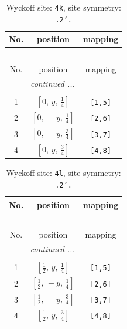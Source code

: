 \documentclass[fleqn,8pt]{jsarticle}
\begin{document}
\renewcommand{\arraystretch}{1.2}
\begin{longtable}{ccc}
\caption{Wyckoff site: {\tt 4k}, site symmetry: {\tt .2'.}}
 \\
 \hline \hline
No. & position & mapping \\ \hline \endfirsthead

\multicolumn{2}{l}{\tablename\ \thetable{}} \\
 \hline \hline
No. & position & mapping \\ \hline \endhead

 \hline \hline
\multicolumn{2}{r}{\footnotesize\it continued ...} \\ \endfoot

 \hline \hline
\multicolumn{2}{r}{} \\ \endlastfoot

1 & $\left[ 0,\, y,\, \frac{1}{4} \right]$ & {\tt [1,5]} \\ \hline
2 & $\left[ 0,\, - y,\, \frac{1}{4} \right]$ & {\tt [2,6]} \\ \hline
3 & $\left[ 0,\, - y,\, \frac{3}{4} \right]$ & {\tt [3,7]} \\ \hline
4 & $\left[ 0,\, y,\, \frac{3}{4} \right]$ & {\tt [4,8]} \\
\end{longtable}
\renewcommand{\arraystretch}{1.2}
\begin{longtable}{ccc}
\caption{Wyckoff site: {\tt 4l}, site symmetry: {\tt .2'.}}
 \\
 \hline \hline
No. & position & mapping \\ \hline \endfirsthead

\multicolumn{2}{l}{\tablename\ \thetable{}} \\
 \hline \hline
No. & position & mapping \\ \hline \endhead

 \hline \hline
\multicolumn{2}{r}{\footnotesize\it continued ...} \\ \endfoot

 \hline \hline
\multicolumn{2}{r}{} \\ \endlastfoot

1 & $\left[ \frac{1}{2},\, y,\, \frac{1}{4} \right]$ & {\tt [1,5]} \\ \hline
2 & $\left[ \frac{1}{2},\, - y,\, \frac{1}{4} \right]$ & {\tt [2,6]} \\ \hline
3 & $\left[ \frac{1}{2},\, - y,\, \frac{3}{4} \right]$ & {\tt [3,7]} \\ \hline
4 & $\left[ \frac{1}{2},\, y,\, \frac{3}{4} \right]$ & {\tt [4,8]} \\
\end{longtable}
\end{document}
